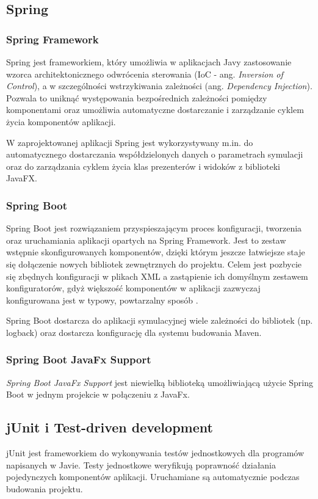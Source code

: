 \subsection{Spring}
\subsubsection{Spring Framework}
Spring jest frameworkiem, który umożliwia w aplikacjach Javy zastosowanie wzorca architektonicznego odwrócenia sterowania (IoC - ang. {\it Inversion of Control}), a w szczególności wstrzykiwania zależności (ang. {\it Dependency Injection}). Pozwala to uniknąć występowania bezpośrednich zależności pomiędzy komponentami oraz umożliwia automatyczne dostarczanie i zarządzanie cyklem życia komponentów aplikacji.

W zaprojektowanej aplikacji Spring jest wykorzystywany m.in. do automatycznego dostarczania współdzielonych danych o parametrach symulacji oraz do zarządzania cyklem życia klas prezenterów i widoków z biblioteki JavaFX.

\subsubsection{Spring Boot}
Spring Boot jest rozwiązaniem przyspieszającym proces konfiguracji, tworzenia oraz uruchamiania aplikacji opartych na Spring Framework.
Jest to zestaw wstępnie skonfigurowanych komponentów, dzięki którym jeszcze łatwiejsze staje się dołączenie nowych bibliotek zewnętrznych do projektu. Celem jest pozbycie się zbędnych konfiguracji w plikach XML a zastąpienie ich domyślnym zestawem konfiguratorów, gdyż większość komponentów w aplikacji zazwyczaj konfigurowana jest w typowy, powtarzalny sposób \cite{docs-springboot}.

Spring Boot dostarcza do aplikacji symulacyjnej wiele zależności do bibliotek (np. logback) oraz dostarcza konfigurację dla systemu budowania Maven.
\subsubsection{Spring Boot JavaFx Support}
{\it Spring Boot JavaFx Support} jest niewielką biblioteką umożliwiającą użycie Spring Boot w jednym projekcie w połączeniu z JavaFx.

\subsection{jUnit i Test-driven development}
jUnit jest frameworkiem do wykonywania testów jednostkowych dla programów napisanych w Javie. Testy jednostkowe weryfikują poprawność działania pojedynczych komponentów aplikacji. Uruchamiane są automatycznie podczas budowania projektu.


